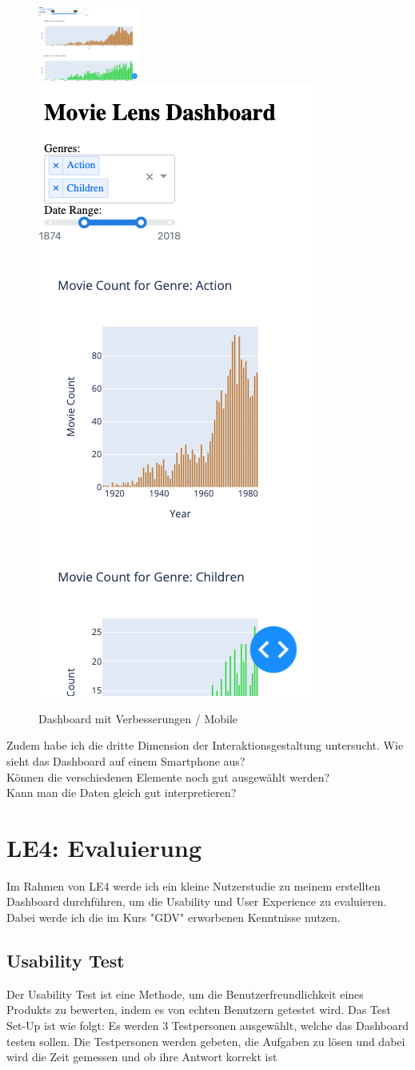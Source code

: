 \documentclass{article}
\begin{document}
\begin{figure}[!h]
\centering
\includegraphics[width=0.3\textwidth]{img/dashboard_updated.png}
\includegraphics[height=0.25\textwidth]{img/dashboard_mobile.png}
\caption{\label{fig: LE3 Dashboard mit Verbesserungen / Mobile} Dashboard mit Verbesserungen / Mobile}
\end{figure}
\noindent
Zudem habe ich die dritte Dimension der Interaktionsgestaltung untersucht. Wie sieht das Dashboard auf einem Smartphone aus?\\
Können die verschiedenen Elemente noch gut ausgewählt werden?\\
Kann man die Daten gleich gut interpretieren?\\

\newpage
\section{LE4: Evaluierung}

Im Rahmen von LE4 werde ich ein kleine Nutzerstudie zu meinem erstellten Dashboard durchführen, um die Usability und User Experience zu evaluieren. 
Dabei werde ich die im Kurs "GDV" erworbenen Kenntnisse nutzen.

\subsection{Usability Test}
Der Usability Test ist eine Methode, um die Benutzerfreundlichkeit eines Produkts zu bewerten, indem es von echten Benutzern getestet wird.
Das Test Set-Up ist wie folgt: Es werden 3 Testpersonen ausgewählt, welche das Dashboard testen sollen.
Die Testpersonen werden gebeten, die Aufgaben zu lösen und dabei wird die Zeit gemessen und ob ihre Antwort korrekt ist\\
\end{document}
